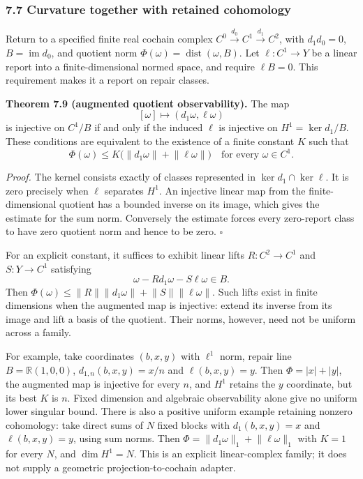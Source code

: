 \documentclass[
  11pt,
]{article}
\begin{document}
\subsubsection{7.7 Curvature together with retained cohomology}\label{curvature-together-with-retained-cohomology}

Return to a specified finite real cochain complex
\(C^0\xrightarrow{d_0}C^1\xrightarrow{d_1}C^2\), with \(d_1d_0=0\),
\(B=\operatorname{im}d_0\), and quotient norm
\(\Phi(\omega)=\operatorname{dist}(\omega,B)\). Let
\(\ell:C^1\to Y\) be a linear report into a finite-dimensional normed space,
and require \(\ell B=0\). This requirement makes it a report on repair classes.

\textbf{Theorem 7.9 (augmented quotient observability).} The map
\[
[\omega]\longmapsto(d_1\omega,\ell\omega)
\]
is injective on \(C^1/B\) if and only if the induced \(\ell\) is injective on
\(H^1=\ker d_1/B\). These conditions are equivalent to the existence of a finite
constant \(K\) such that
\[
\Phi(\omega)\le K\bigl(\lVert d_1\omega\rVert+\lVert \ell\omega\rVert\bigr)
\quad\text{for every }\omega\in C^1.
\]

\emph{Proof.} The kernel consists exactly of classes represented in
\(\ker d_1\cap\ker\ell\). It is zero precisely when \(\ell\) separates
\(H^1\). An injective linear map from the finite-dimensional quotient has a
bounded inverse on its image, which gives the estimate for the sum norm.
Conversely the estimate forces every zero-report class to have zero quotient
norm and hence to be zero. \(\square\)

For an explicit constant, it suffices to exhibit linear lifts \(R:C^2\to C^1\)
and \(S:Y\to C^1\) satisfying
\[
\omega-Rd_1\omega-S\ell\omega\in B.
\]
Then \(\Phi(\omega)\le\lVert R\rVert\lVert d_1\omega\rVert+\lVert S\rVert\lVert \ell\omega\rVert\).
Such lifts exist in finite dimensions when the augmented map is injective:
extend its inverse from its image and lift a basis of the quotient.
Their norms, however, need not be uniform across a family.

For example, take coordinates \((b,x,y)\) with \(\ell^1\) norm, repair line
\(B=\mathbb R(1,0,0)\), \(d_{1,n}(b,x,y)=x/n\) and \(\ell(b,x,y)=y\).
Then \(\Phi=|x|+|y|\), the augmented map is injective for every \(n\), and
\(H^1\) retains the \(y\) coordinate, but its best \(K\) is \(n\). Fixed dimension
and algebraic observability alone give no uniform lower singular bound.
There is also a positive uniform example retaining nonzero cohomology:
take direct sums of \(N\) fixed blocks with \(d_1(b,x,y)=x\) and \(\ell(b,x,y)=y\),
using sum norms. Then
\(\Phi=\lVert d_1\omega\rVert_1+\lVert \ell\omega\rVert_1\) with \(K=1\) for every \(N\),
and \(\dim H^1=N\). This is an explicit linear-complex family; it does not
supply a geometric projection-to-cochain adapter.
\end{document}
